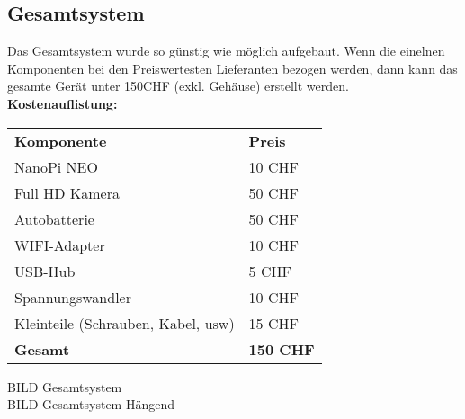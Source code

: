 \subsection{Gesamtsystem}
Das Gesamtsystem wurde so g\"unstig wie m\"oglich aufgebaut. Wenn die einelnen Komponenten bei den Preiswertesten Lieferanten bezogen werden, dann kann das gesamte Ger\"at unter 150CHF (exkl. Geh\"ause) erstellt werden. \\

\textbf{Kostenauflistung:}\\
\begin{table}[H]
    \begin{tabular}{ll}
    \textbf{Komponente}                & \textbf{Preis}   \\
    NanoPi NEO                         & 10 CHF  \\
    Full HD Kamera                     & 50 CHF  \\
    Autobatterie                       & 50 CHF  \\ 
    WIFI-Adapter                       & 10 CHF  \\
    USB-Hub                            & 5 CHF   \\
    Spannungswandler                   & 10 CHF  \\
    Kleinteile (Schrauben, Kabel, usw) & 15 CHF  \\ \hline
    \textbf{Gesamt}                    & \textbf{150 CHF} \\
    \end{tabular}
\end{table}

BILD Gesamtsystem\\
BILD Gesamtsystem Hängend\\